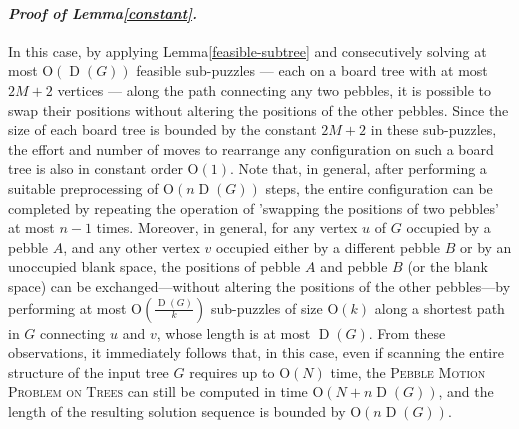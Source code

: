 \documentclass[letter,11pt]{article}
\newcommand{\white}{\qquad{\framebox{\rule{0pt}{4pt}}}}
\newcommand{\owari}{\hfill\white}
\theoremstyle{definition}
\theoremstyle{definition}
\DeclareMathOperator{\D}{D}
\newcommand{\1}{\boldmath$~1~$\unboldmath}
\newcommand{\Ord}{\mathrm{O}}
\newcommand{\qedgo}{\vspace{0.35cm}}
\newcommand{\tume}{\hspace*{0.2em}}
\newenvironment{Proofof}[1]{\expandafter
\paragraph{{\it Proof of #1.}}}{\hspace{5mm}\owari\qedgo}
\begin{document}
\begin{Proofof}{Lemma\tume\ref{constant}}
In this case, by applying Lemma\tume\ref{feasible-subtree} and consecutively solving at most 
$\Ord(\D(G))$ feasible sub-puzzles --- each on a board tree with at most $2M+2$ vertices --- 
along the path connecting any two pebbles, it is possible to swap their positions 
without altering the positions of the other pebbles. Since the size of each board tree is 
bounded by the constant $2M+2$ in these sub-puzzles, the effort and number of moves 
to rearrange any configuration on such a board tree is also in constant order $\Ord(1)$. 
Note that, in general, after performing a suitable preprocessing of $\Ord(n\D(G))$ steps, 
the entire configuration can be completed by repeating the operation of 
'swapping the positions of two pebbles' at most $n-1$ times. 
Moreover, in general, for any vertex $u$ of $G$ occupied by a pebble $A$, 
and any other vertex $v$ occupied either by a different pebble $B$ or 
by an unoccupied blank space, the positions of pebble $A$ and pebble $B$ 
(or the blank space) can be exchanged—without altering the positions of 
the other pebbles—by performing at most $\Ord\left(\frac{\D(G)}{k}\right)$
sub-puzzles of size $\Ord(k)$ along a shortest path in $G$ connecting $u$ 
and $v$, whose length is at most $\D(G)$.
From these observations, it immediately follows that, in this case, even if scanning 
the entire structure of the input tree $G$ requires up to $\Ord(N)$ time, 
the \textsc{Pebble Motion Problem on Trees} can still be computed in time  
$\Ord(N+n\D(G))$, and the length of the resulting 
solution sequence is bounded by $\Ord(n\D(G)).$
\end{Proofof}
\end{document}
